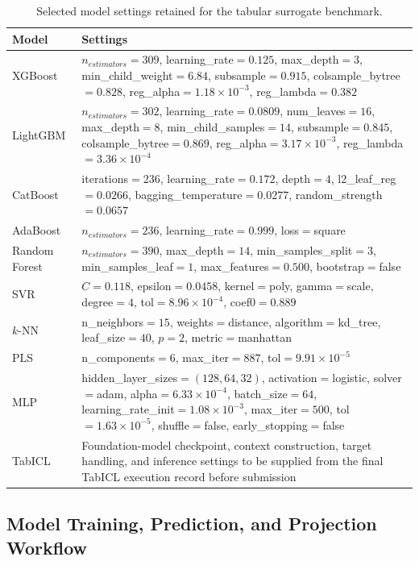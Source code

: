 \documentclass[a4paper,fleqn]{cas-sc}
\begin{document}
\begin{table}[htbp]
\centering
\caption{Selected model settings retained for the tabular surrogate benchmark.}
\label{tab:model_hyperparameters}
\scriptsize
\setlength{\tabcolsep}{3pt}
\begin{tabular}{p{2.0cm}p{8.7cm}}
\hline
Model & Settings \\
\hline
XGBoost & $n_{estimators}=309$, learning\_rate$=0.125$, max\_depth$=3$, min\_child\_weight$=6.84$, subsample$=0.915$, colsample\_bytree$=0.828$, reg\_alpha$=1.18 \times 10^{-3}$, reg\_lambda$=0.382$ \\
LightGBM & $n_{estimators}=302$, learning\_rate$=0.0809$, num\_leaves$=16$, max\_depth$=8$, min\_child\_samples$=14$, subsample$=0.845$, colsample\_bytree$=0.869$, reg\_alpha$=3.17 \times 10^{-3}$, reg\_lambda$=3.36 \times 10^{-4}$ \\
CatBoost & iterations$=236$, learning\_rate$=0.172$, depth$=4$, l2\_leaf\_reg$=0.0266$, bagging\_temperature$=0.0277$, random\_strength$=0.0657$ \\
AdaBoost & $n_{estimators}=236$, learning\_rate$=0.999$, loss$=$square \\
Random Forest & $n_{estimators}=390$, max\_depth$=14$, min\_samples\_split$=3$, min\_samples\_leaf$=1$, max\_features$=0.500$, bootstrap$=$false \\
SVR & $C=0.118$, epsilon$=0.0458$, kernel$=$poly, gamma$=$scale, degree$=4$, tol$=8.96 \times 10^{-4}$, coef0$=0.889$ \\
$k$-NN & n\_neighbors$=15$, weights$=$distance, algorithm$=$kd\_tree, leaf\_size$=40$, $p=2$, metric$=$manhattan \\
PLS & n\_components$=6$, max\_iter$=887$, tol$=9.91 \times 10^{-5}$ \\
MLP & hidden\_layer\_sizes$=(128,64,32)$, activation$=$logistic, solver$=$adam, alpha$=6.33 \times 10^{-4}$, batch\_size$=64$, learning\_rate\_init$=1.08 \times 10^{-3}$, max\_iter$=500$, tol$=1.63 \times 10^{-5}$, shuffle$=$false, early\_stopping$=$false \\
TabICL & Foundation-model checkpoint, context construction, target handling, and inference settings to be supplied from the final TabICL execution record before submission \\
\hline
\end{tabular}
\end{table}

\subsection{Model Training, Prediction, and Projection Workflow}
\end{document}
